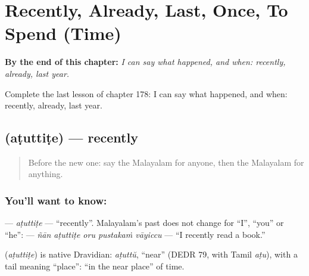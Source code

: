 
\chapter{Recently, Already, Last, Once, To Spend (Time)}
\label{ch:ml-recently-already-last-once-to-spend-time}

\begin{chapteropening}
\textbf{By the end of this chapter:} \emph{I can say what happened, and when: recently, already, last year.}

Complete the last lesson of chapter 178: I can say what happened, and when: recently, already, last year.
\end{chapteropening}

\section[\texorpdfstring{\ml{അടുത്തിടെ} (aṭuttiṭe)}{അടുത്തിടെ (aṭuttiṭe)}]{ (aṭuttiṭe) — recently}

\label{lesson:ML-C178-atuttite}



\begin{quote}
Before the new one: say the Malayalam for anyone, then the Malayalam for anything.
\end{quote}

\subsection*{You'll want to know: }
\textbf{} — \emph{aṭuttiṭe} — \textquotedblleft{}recently\textquotedblright{}. Malayalam's past does not change for \textquotedblleft{}I\textquotedblright{}, \textquotedblleft{}you\textquotedblright{} or \textquotedblleft{}he\textquotedblright{}: \textbf{    } — \emph{ñān aṭuttiṭe oru pustakaṁ vāyiccu} — \textquotedblleft{}I recently read a book.\textquotedblright{}

\begin{cousinweb}
\textbf{} (\emph{aṭuttiṭe}) is native Dravidian: \emph{aṭuttŭ}, \textquotedblleft{}near\textquotedblright{} (DEDR 79, with Tamil \emph{aṭu}), with a tail meaning \textquotedblleft{}place\textquotedblright{}: \textquotedblleft{}in the near place\textquotedblright{} of time.
\end{cousinweb}

